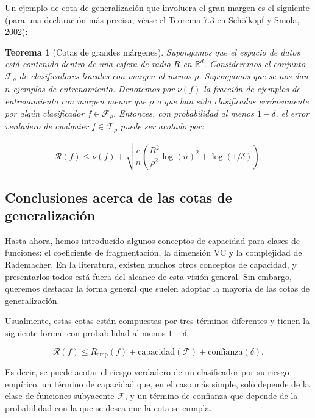 \documentclass{article}
\newtheorem{thm}{Teorema}[subsection]
\begin{document}
Un ejemplo de cota de generalización que involucra el gran margen es el siguiente (para una 
declaración más precisa, véase el Teorema 7.3 en Schölkopf y Smola, 2002):\newline

\begin{thm}[Cotas de grandes márgenes]

Supongamos que el espacio de datos está contenido dentro de una esfera de radio \(R\) en 
\(\mathbb{R}^d\). Consideremos el conjunto \(\mathcal{F}_\rho\) de clasificadores lineales con 
margen al menos \(\rho\). Supongamos que se nos dan \(n\) ejemplos de entrenamiento. Denotemos 
por \(\nu(f)\) la fracción de ejemplos de entrenamiento con margen menor que \(\rho\) o que han 
sido clasificados erróneamente por algún clasificador \(f \in \mathcal{F}_\rho\). Entonces, con 
probabilidad al menos \(1 - \delta\), el error verdadero de cualquier \(f \in \mathcal{F}_\rho\) 
puede ser acotado por:

\[
\mathcal{R}(f) \leq \nu(f) + \sqrt{\frac{c}{n} \left( \frac{R^2}{\rho^2} \log(n)^2 + \log(1/\delta) \right)} .
\]
\end{thm}

\subsection{Conclusiones acerca de las cotas de generalización}

Hasta ahora, hemos introducido algunos conceptos de capacidad para clases de funciones: el 
coeficiente de fragmentación, la dimensión VC y la complejidad de Rademacher. En la literatura, 
existen muchos otros conceptos de capacidad, y presentarlos todos está fuera del alcance de esta 
visión general. Sin embargo, queremos destacar la forma general que suelen adoptar la mayoría 
de las cotas de generalización.\newline

Usualmente, estas cotas están compuestas por tres términos diferentes y tienen la siguiente forma: 
con probabilidad al menos \(1 - \delta\),

\[
\mathcal{R}(f) \leq R_{\text{emp}}(f) + \text{capacidad}(\mathcal{F}) + \text{confianza}(\delta).
\]

Es decir, se puede acotar el riesgo verdadero de un clasificador por su riesgo empírico, un término 
de capacidad que, en el caso más simple, solo depende de la clase de funciones subyacente 
\(\mathcal{F}\), y un término de confianza que depende de la probabilidad con la que se desea que 
la cota se cumpla.\newline
\end{document}
